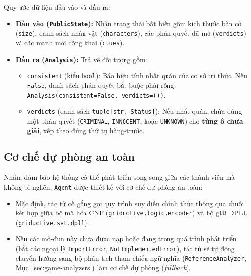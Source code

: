 \noindent
Quy ước dữ liệu đầu vào và đầu ra:
\begin{itemize}
    \item \textbf{Đầu vào (\texttt{PublicState}):} Nhận trạng thái bất biến gồm kích thước bàn cờ (\texttt{size}), danh sách nhân vật (\texttt{characters}), các phán quyết đã mở (\texttt{verdicts}) và các manh mối công khai (\texttt{clues}).
    \item \textbf{Đầu ra (\texttt{Analysis}):} Trả về đối tượng gồm:
    \begin{itemize}
        \item \texttt{consistent} (kiểu \texttt{bool}): Báo hiệu tính nhất quán của cơ sở tri thức. Nếu \texttt{False}, danh sách phán quyết bắt buộc phải rỗng: \texttt{Analysis(consistent=False, verdicts=())}.
        \item \texttt{verdicts} (danh sách \texttt{tuple[str, Status]}): Nếu nhất quán, chứa đúng một phán quyết (\texttt{CRIMINAL}, \texttt{INNOCENT}, hoặc \texttt{UNKNOWN}) cho \textbf{từng ô chưa giải}, xếp theo đúng thứ tự hàng-trước.
    \end{itemize}
\end{itemize}

\subsection{Cơ chế dự phòng an toàn}
Nhằm đảm bảo hệ thống có thể phát triển song song giữa các thành viên mà không bị nghẽn, \texttt{Agent} được thiết kế với cơ chế dự phòng an toàn:
\begin{itemize}
    \item Mặc định, tác tử cố gắng gọi quy trình suy diễn chính thức thông qua chuỗi kết hợp giữa bộ mã hóa CNF (\texttt{griductive.logic.encoder}) và bộ giải DPLL (\texttt{griductive.sat.dpll}).
    \item Nếu các mô-đun này chưa được nạp hoặc đang trong quá trình phát triển (bắt các ngoại lệ \texttt{ImportError}, \texttt{NotImplementedError}), tác tử sẽ tự động chuyển hướng sang bộ phân tích tham chiếu ngữ nghĩa (\texttt{ReferenceAnalyzer}, Mục~\ref{sec:game-analyzers}) làm cơ chế dự phòng (\textit{fallback}).
\end{itemize}

